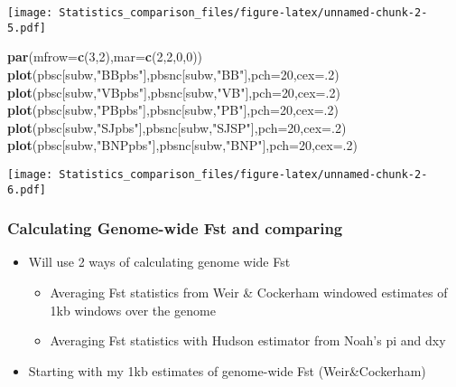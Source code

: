 \documentclass[]{article}
\newenvironment{Shaded}{\begin{snugshade}}{\end{snugshade}}
\newcommand{\KeywordTok}[1]{\textcolor[rgb]{0.13,0.29,0.53}{\textbf{#1}}}
\newcommand{\DataTypeTok}[1]{\textcolor[rgb]{0.13,0.29,0.53}{#1}}
\newcommand{\DecValTok}[1]{\textcolor[rgb]{0.00,0.00,0.81}{#1}}
\newcommand{\StringTok}[1]{\textcolor[rgb]{0.31,0.60,0.02}{#1}}
\newcommand{\NormalTok}[1]{#1}
\providecommand{\tightlist}{%
  \setlength{\itemsep}{0pt}\setlength{\parskip}{0pt}}
\begin{document}
\texttt{[image: Statistics\_comparison\_files/figure-latex/unnamed-chunk-2-5.pdf]}

\begin{Shaded}
\begin{Highlighting}[]
\KeywordTok{par}\NormalTok{(}\DataTypeTok{mfrow=}\KeywordTok{c}\NormalTok{(}\DecValTok{3}\NormalTok{,}\DecValTok{2}\NormalTok{),}\DataTypeTok{mar=}\KeywordTok{c}\NormalTok{(}\DecValTok{2}\NormalTok{,}\DecValTok{2}\NormalTok{,}\DecValTok{0}\NormalTok{,}\DecValTok{0}\NormalTok{))}
\KeywordTok{plot}\NormalTok{(pbsc[subw,}\StringTok{"BBpbs"}\NormalTok{],pbsnc[subw,}\StringTok{"BB"}\NormalTok{],}\DataTypeTok{pch=}\DecValTok{20}\NormalTok{,}\DataTypeTok{cex=}\NormalTok{.}\DecValTok{2}\NormalTok{)}
\KeywordTok{plot}\NormalTok{(pbsc[subw,}\StringTok{"VBpbs"}\NormalTok{],pbsnc[subw,}\StringTok{"VB"}\NormalTok{],}\DataTypeTok{pch=}\DecValTok{20}\NormalTok{,}\DataTypeTok{cex=}\NormalTok{.}\DecValTok{2}\NormalTok{)}
\KeywordTok{plot}\NormalTok{(pbsc[subw,}\StringTok{"PBpbs"}\NormalTok{],pbsnc[subw,}\StringTok{"PB"}\NormalTok{],}\DataTypeTok{pch=}\DecValTok{20}\NormalTok{,}\DataTypeTok{cex=}\NormalTok{.}\DecValTok{2}\NormalTok{)}
\KeywordTok{plot}\NormalTok{(pbsc[subw,}\StringTok{"SJpbs"}\NormalTok{],pbsnc[subw,}\StringTok{"SJSP"}\NormalTok{],}\DataTypeTok{pch=}\DecValTok{20}\NormalTok{,}\DataTypeTok{cex=}\NormalTok{.}\DecValTok{2}\NormalTok{)}
\KeywordTok{plot}\NormalTok{(pbsc[subw,}\StringTok{"BNPpbs"}\NormalTok{],pbsnc[subw,}\StringTok{"BNP"}\NormalTok{],}\DataTypeTok{pch=}\DecValTok{20}\NormalTok{,}\DataTypeTok{cex=}\NormalTok{.}\DecValTok{2}\NormalTok{)}
\end{Highlighting}
\end{Shaded}

\texttt{[image: Statistics\_comparison\_files/figure-latex/unnamed-chunk-2-6.pdf]}

\subsubsection{Calculating Genome-wide Fst and
comparing}\label{calculating-genome-wide-fst-and-comparing}

\begin{itemize}
\tightlist
\item
  Will use 2 ways of calculating genome wide Fst

  \begin{itemize}
  \tightlist
  \item
    Averaging Fst statistics from Weir \& Cockerham windowed estimates
    of 1kb windows over the genome
  \item
    Averaging Fst statistics with Hudson estimator from Noah's pi and
    dxy
  \end{itemize}
\item
  Starting with my 1kb estimates of genome-wide Fst (Weir\&Cockerham)
\end{itemize}
\end{document}
